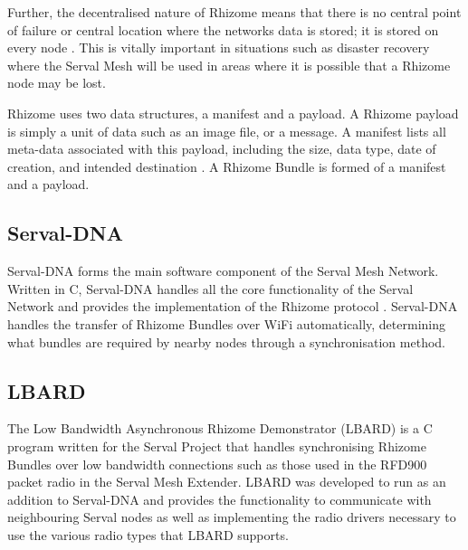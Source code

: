Further, the decentralised nature of Rhizome means that there is no central point of failure or central location where the networks data is stored; it is stored on every node \parencite{servalWiFiMultiModel}.
This is vitally important in situations such as disaster recovery where the Serval Mesh will be used in areas where it is possible that a Rhizome node may be lost.

Rhizome uses two data structures, a manifest and a payload.
A Rhizome payload is simply a unit of data such as an image file, or a message.
A manifest lists all meta-data associated with this payload, including the size, data type, date of creation, and intended destination \parencite{gardner2011serval}.
A Rhizome Bundle is formed of a manifest and a payload. 

\subsection{Serval-DNA}
Serval-DNA forms the main software component of the Serval Mesh Network.
Written in C, Serval-DNA handles all the core functionality of the Serval Network and provides the implementation of the Rhizome protocol \parencite{servalMesh2013}. 
Serval-DNA handles the transfer of Rhizome Bundles over WiFi automatically, determining what bundles are required by nearby nodes through a synchronisation method.

\subsection{LBARD}
The Low Bandwidth Asynchronous Rhizome Demonstrator (LBARD) is a C program written for the Serval Project that handles synchronising Rhizome Bundles over low bandwidth connections such as those used in the RFD900 packet radio in the Serval Mesh Extender.
LBARD was developed to run as an addition to Serval-DNA and provides the functionality to communicate with neighbouring Serval nodes as well as implementing the radio drivers necessary to use the various radio types that LBARD supports.

